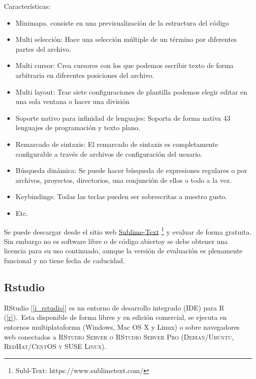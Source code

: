 \documentclass[12pt]{book} %
\begin{document}
		Características:
		\begin{multicols}{2}
			\begin{itemize}
				 \item Minimapa. consiste en una previsualización de la estructura del código
				 \item Multi selección: Hace una selección múltiple de un término por diferentes partes del archivo.
				 \item Multi cursor: Crea cursores con los que podemos escribir texto de forma arbitraria en diferentes posiciones del
				 	   archivo.
				 \item Multi layout: Trae siete configuraciones de plantilla podemos elegir editar en una sola ventana o hacer una división
				 \item Soporte nativo para infinidad de lenguajes: Soporta de forma nativa 43 lenguajes de programación y texto plano.
				 \item Remarcado de sintaxis: El remarcado de sintaxis es completamente configurable a través de archivos de configuración 
				 	   del usuario.
				 \item Búsqueda dinámica: Se puede hacer búsqueda de expresiones regulares o por archivos, proyectos, directorios, una 
				 	   conjunción de ellos o todo a la vez.
				 \item Keybindings: Todas las teclas pueden ser sobrescritas a nuestro gusto.
				 \item Etc.
			\end{itemize}
		\end{multicols}
		
		Se puede descargar desde el sitio web \href{https://www.sublimetext.com/}{Sublime-Text} 
		\footnote{\scriptsize Subl-Text: https://www.sublimetext.com/}
		y evaluar de forma gratuita. Sin embargo no es software libre o de código abiertoy se debe obtener una licencia 	para su uso
		continuado, aunque la versión de evaluación es plenamente funcional y no tiene fecha de caducidad.
				
		
		
	\subsection{Rstudio \label{RS}}
		RStudio [\ref{i_rstudio}] es un entorno de desarrollo integrado (\textsc{IDE}) para R (\ref{r}).\
		Esta disponible de forma libres y en edición comercial, se ejecuta en entornos multiplataforma (Windows, Mac OS X y Linux) o
		sobre navegadores web conectados a \textsc{RStudio Server o RStudio Server Pro (Debian/Ubuntu, RedHat/CentOS y SUSE Linux)}.\\
		
\end{document}
